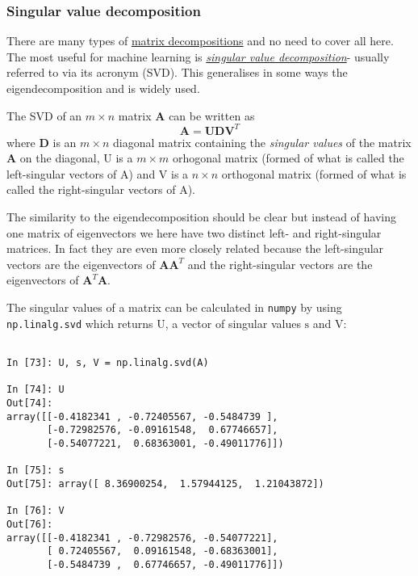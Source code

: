 \documentclass[a4paper,10pt]{article}
\newcommand{\link}[2]{{\color{blue}\href{#1}{#2}}}
\begin{document}
\subsubsection{ Singular value decomposition}


There are many types of
\link{https://en.wikipedia.org/wiki/Matrix_decomposition}{matrix
  decompositions} and no need to cover all here. The most useful for
machine learning is
\link{https://en.wikipedia.org/wiki/Singular_value_decomposition}{\textit{singular
    value decomposition}}- usually referred to via its acronym
(SVD). This generalises in some ways the eigendecomposition and is
widely used.

The SVD of an $m \times n$ matrix $\mathbf{A}$ can be written
as $$\mathbf{A} = \mathbf{U}\mathbf{D}\mathbf{V}^T$$ where
$\mathbf{D}$ is an $m\times n$ diagonal matrix containing the
\textit{singular values} of the matrix $\mathbf{A}$ on the diagonal,
$\mathrm{U}$ is a $m\times m$ orhogonal matrix (formed of what is
called the left-singular vectors of $\mathrm{A}$) and $\mathrm{V}$ is
a $n\times n$ orthogonal matrix (formed of what is called the
right-singular vectors of $\mathrm{A}$).

The similarity to the eigendecomposition should be clear but instead
of having one matrix of eigenvectors we here have two distinct left-
and right-singular matrices. In fact they are even more closely
related because the left-singular vectors are the eigenvectors of
$\mathbf{A}\mathbf{A}^T$ and the right-singular vectors are the
eigenvectors of $\mathbf{A}^T\mathbf{A}$.

The singular values of a matrix can be calculated in \texttt{numpy} by
using \texttt{np.linalg.svd} which returns $\mathrm{U}$, a vector of
singular values $\mathrm{s}$ and $\mathrm{V}$:

\begin{lstlisting}

In [73]: U, s, V = np.linalg.svd(A)

In [74]: U
Out[74]: 
array([[-0.4182341 , -0.72405567, -0.5484739 ],
       [-0.72982576, -0.09161548,  0.67746657],
       [-0.54077221,  0.68363001, -0.49011776]])

In [75]: s
Out[75]: array([ 8.36900254,  1.57944125,  1.21043872])

In [76]: V
Out[76]: 
array([[-0.4182341 , -0.72982576, -0.54077221],
       [ 0.72405567,  0.09161548, -0.68363001],
       [-0.5484739 ,  0.67746657, -0.49011776]])
\end{lstlisting}
\end{document}
